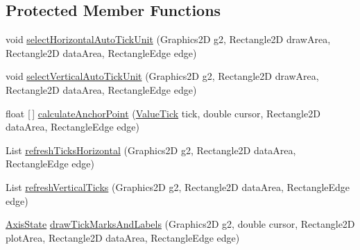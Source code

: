 \subsection*{Protected Member Functions}
\begin{DoxyCompactItemize}
\item 
void \mbox{\hyperlink{classorg_1_1jfree_1_1chart_1_1axis_1_1_cyclic_number_axis_ac5fe7aa93c10fc46b6d3d5a89ae9ca1a}{select\+Horizontal\+Auto\+Tick\+Unit}} (Graphics2D g2, Rectangle2D draw\+Area, Rectangle2D data\+Area, Rectangle\+Edge edge)
\item 
void \mbox{\hyperlink{classorg_1_1jfree_1_1chart_1_1axis_1_1_cyclic_number_axis_a5da077255940317234927bcccd3bd5ab}{select\+Vertical\+Auto\+Tick\+Unit}} (Graphics2D g2, Rectangle2D draw\+Area, Rectangle2D data\+Area, Rectangle\+Edge edge)
\item 
float \mbox{[}$\,$\mbox{]} \mbox{\hyperlink{classorg_1_1jfree_1_1chart_1_1axis_1_1_cyclic_number_axis_aa784d7c9705453afa7962e930cb163f3}{calculate\+Anchor\+Point}} (\mbox{\hyperlink{classorg_1_1jfree_1_1chart_1_1axis_1_1_value_tick}{Value\+Tick}} tick, double cursor, Rectangle2D data\+Area, Rectangle\+Edge edge)
\item 
List \mbox{\hyperlink{classorg_1_1jfree_1_1chart_1_1axis_1_1_cyclic_number_axis_a49dffba8e7451cfee856faee0fbd8575}{refresh\+Ticks\+Horizontal}} (Graphics2D g2, Rectangle2D data\+Area, Rectangle\+Edge edge)
\item 
List \mbox{\hyperlink{classorg_1_1jfree_1_1chart_1_1axis_1_1_cyclic_number_axis_a38da240ecc07753098d4491604d58dcb}{refresh\+Vertical\+Ticks}} (Graphics2D g2, Rectangle2D data\+Area, Rectangle\+Edge edge)
\item 
\mbox{\hyperlink{classorg_1_1jfree_1_1chart_1_1axis_1_1_axis_state}{Axis\+State}} \mbox{\hyperlink{classorg_1_1jfree_1_1chart_1_1axis_1_1_cyclic_number_axis_a39d63480d329ee926edf4bc59d8a64db}{draw\+Tick\+Marks\+And\+Labels}} (Graphics2D g2, double cursor, Rectangle2D plot\+Area, Rectangle2D data\+Area, Rectangle\+Edge edge)
\end{DoxyCompactItemize}
